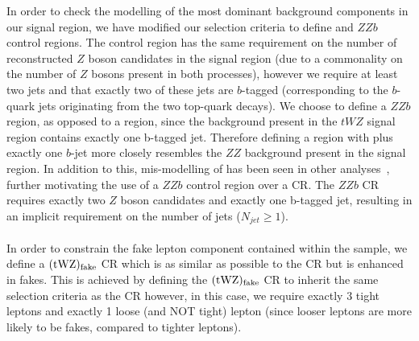 In order to check the modelling of the most dominant background components in our signal region, we have modified our selection criteria to define \ttZ and $ZZb$ control regions. The \ttZ control region has the same requirement on the number of reconstructed $Z$ boson candidates in the signal region (due to a commonality on the number of $Z$ bosons present in both processes), however we require at least two jets and that exactly two of these jets are $b$-tagged (corresponding to the $b$-quark jets originating from the two top-quark decays). We choose to define a $ZZb$ region, as opposed to a \ZZ region, since the \ZZ background present in the $tWZ$ signal region contains exactly one b-tagged jet. Therefore defining a region with \ZZ plus exactly one $b$-jet more closely resembles the $ZZ$ background present in the signal region. In addition to this, mis-modelling of \ZZ has been seen in other analyses~\cite{Aaboud:2019, ppToZZ:CMSpaper}, further motivating the use of a $ZZb$ control region over a \ZZ CR. The $ZZb$ CR requires exactly two $Z$ boson candidates and exactly one b-tagged jet, resulting in an implicit requirement on the number of jets ($N_{jet} \geq 1$).\\\\

In order to constrain the fake lepton component contained within the \ttZ sample, we define a $(\tWZ)_{\text{fake}}$ CR which is as similar as possible to the \tWZ CR but is enhanced in fakes. This is achieved by defining the $(\tWZ)_{\text{fake}}$ CR to inherit the same selection criteria as the \ttZ CR however, in this case, we require exactly 3 tight leptons and exactly 1 loose (and NOT tight) lepton (since looser leptons are more likely to be fakes, compared to tighter leptons).\\\\

